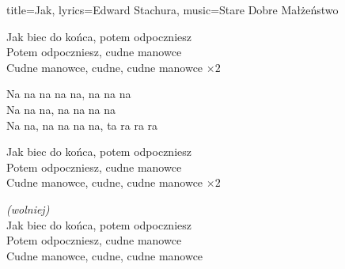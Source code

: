 \begin{song}{title={Jak}, lyrics={Edward Stachura}, music={Stare Dobre Małżeństwo}}
    \begin{verse*}
        Jak biec do końca, potem odpoczniesz \\
        Potem odpoczniesz, cudne manowce \\
        Cudne manowce, cudne, cudne manowce $\times 2$
    \end{verse*}
    \begin{verse*}
        Na na na na na, na na na \\
        Na na na, na na na na \\
        Na na, na na na na, ta ra ra ra
    \end{verse*}
    \begin{verse*}
        Jak biec do końca, potem odpoczniesz \\
        Potem odpoczniesz, cudne manowce \\
        Cudne manowce, cudne, cudne manowce $\times 2$
    \end{verse*}
    \begin{verse*}
        \textit{(wolniej)} \\
        Jak biec do końca, potem odpoczniesz \\
        Potem odpoczniesz, cudne manowce \\
        Cudne manowce, cudne, cudne manowce
    \end{verse*}
\end{song}


